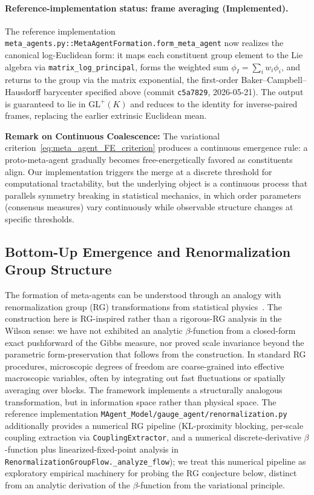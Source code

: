 \documentclass[11pt]{article}
\begin{document}
\paragraph{Reference-implementation status: frame averaging (Implemented).}
The reference implementation \texttt{meta\_agents.py::MetaAgentFormation.form\_meta\_agent} now realizes the canonical log-Euclidean form: it maps each constituent group element to the Lie algebra via \texttt{matrix\_log\_principal}, forms the weighted sum $\phi_I = \sum_i w_i \phi_i$, and returns to the group via the matrix exponential, the first-order Baker--Campbell--Hausdorff barycenter specified above (commit \texttt{c5a7829}, 2026-05-21). The output is guaranteed to lie in $\mathrm{GL}^+(K)$ and reduces to the identity for inverse-paired frames, replacing the earlier extrinsic Euclidean mean.

\textbf{Remark on Continuous Coalescence:} The variational criterion~\eqref{eq:meta_agent_FE_criterion} produces a continuous emergence rule: a proto-meta-agent gradually becomes free-energetically favored as constituents align. Our implementation triggers the merge at a discrete threshold for computational tractability, but the underlying object is a continuous process that parallels symmetry breaking in statistical mechanics, in which order parameters (consensus measures) vary continuously while observable structure changes at specific thresholds.

\subsection{Bottom-Up Emergence and Renormalization Group Structure}

The formation of meta-agents can be understood through an analogy with renormalization group (RG) transformations from statistical physics~\cite{Wilson1971, Cardy1996}. The construction here is RG-inspired rather than a rigorous-RG analysis in the Wilson sense: we have not exhibited an analytic $\beta$-function from a closed-form exact pushforward of the Gibbs measure, nor proved scale invariance beyond the parametric form-preservation that follows from the construction. In standard RG procedures, microscopic degrees of freedom are coarse-grained into effective macroscopic variables, often by integrating out fast fluctuations or spatially averaging over blocks. The framework implements a structurally analogous transformation, but in information space rather than physical space. The reference implementation \texttt{MAgent\_Model/gauge\_agent/renormalization.py} additionally provides a numerical RG pipeline (KL-proximity blocking, per-scale coupling extraction via \texttt{CouplingExtractor}, and a numerical discrete-derivative $\beta$-function plus linearized-fixed-point analysis in \texttt{RenormalizationGroupFlow.\_analyze\_flow}); we treat this numerical pipeline as exploratory empirical machinery for probing the RG conjecture below, distinct from an analytic derivation of the $\beta$-function from the variational principle.
\end{document}
